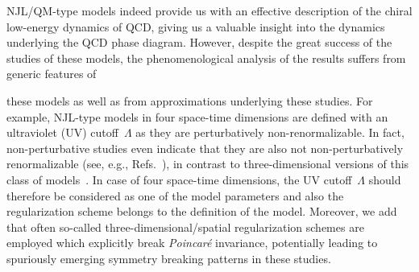 \documentclass[prd,english,preprintnumbers,amsmath,amssymb,nofootinbib,twocolumn,superscriptaddress]{revtex4-1}
\begin{document}
{NJL/QM-type models indeed provide us with an effective description of 
the chiral low-energy dynamics of QCD, giving us a valuable insight 
into the dynamics underlying the QCD phase diagram.
However, despite the great success of the studies of these models, 
the} phenomenological analysis of the results 
suffers from generic features of {these models as well {as from approximations} underlying
these studies.
For example, NJL-type models in four space-time dimensions 
are defined with an ultraviolet (UV) cutoff~$\Lambda$ 
as they are perturbatively non-renormalizable. In fact, non-perturbative
studies even indicate that they are also not non-perturbatively renormalizable (see, e.g., Refs.~\cite{Braun:2011pp,Braun:2012zq}), in contrast
to three-dimensional versions of this class of models~\cite{Braun:2010tt}.
In case of four space-time dimensions, 
the UV cutoff~$\Lambda$ should therefore be considered as one of the model parameters and also
the regularization scheme belongs to the definition of the model. 
Moreover, we add that often so-called three-dimensional/spatial 
regularization schemes are employed which explicitly break {\it Poincar\'{e}} 
invariance, {potentially leading to} spuriously emerging symmetry breaking patterns in these studies.

}
\end{document}
